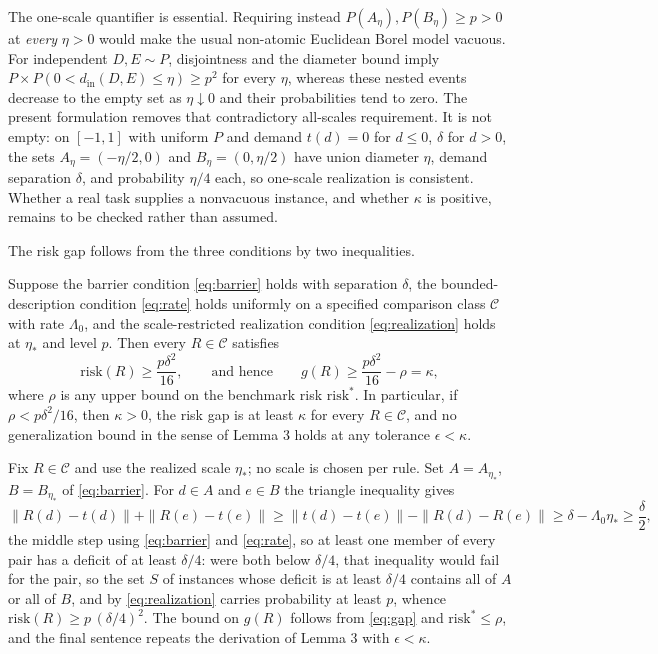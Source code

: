 The one-scale quantifier is essential. Requiring instead $P(A_\eta),P(B_\eta) \ge p>0$ at \emph{every} $\eta>0$ would make the usual non-atomic Euclidean Borel model vacuous. For independent $D,E \sim P$, disjointness and the diameter bound imply $P\times P(0<d_{\mathrm{in}}(D,E)\le\eta) \ge p^2$ for every $\eta$, whereas these nested events decrease to the empty set as $\eta \downarrow 0$ and their probabilities tend to zero. The present formulation removes that contradictory all-scales requirement. It is not empty: on $[-1,1]$ with uniform $P$ and demand $t(d)=0$ for $d\le0$, $\delta$ for $d>0$, the sets $A_\eta=(-\eta/2,0)$ and $B_\eta=(0,\eta/2)$ have union diameter $\eta$, demand separation $\delta$, and probability $\eta/4$ each, so one-scale realization is consistent. Whether a real task supplies a nonvacuous instance, and whether $\kappa$ is positive, remains to be checked rather than assumed.

The risk gap follows from the three conditions by two inequalities.

\begin{uprop}
Suppose the barrier condition \eqref{eq:barrier} holds with separation $\delta$, the bounded-description condition \eqref{eq:rate} holds uniformly on a specified comparison class $\mathcal{C}$ with rate $\Lambda_0$, and the scale-restricted realization condition \eqref{eq:realization} holds at $\eta_*$ and level $p$. Then every $R \in \mathcal{C}$ satisfies
\begin{equation}
\mathrm{risk}(R) \ge \frac{p \delta^2}{16} , \qquad \text{and hence} \qquad g(R) \ge \frac{p \delta^2}{16} - \rho = \kappa ,
\label{eq:floor}
\end{equation}
where $\rho$ is any upper bound on the benchmark risk $\mathrm{risk}^*$. In particular, if $\rho < p \delta^2 / 16$, then $\kappa > 0$, the risk gap is at least $\kappa$ for every $R \in \mathcal{C}$, and no generalization bound in the sense of Lemma 3 holds at any tolerance $\epsilon < \kappa$.
\end{uprop}

\argument Fix $R \in \mathcal{C}$ and use the realized scale $\eta_*$; no scale is chosen per rule. Set $A = A_{\eta_*}$, $B = B_{\eta_*}$ of \eqref{eq:barrier}. For $d \in A$ and $e \in B$ the triangle inequality gives
\begin{equation}
\| R(d) - t(d) \| + \| R(e) - t(e) \| \ge \| t(d) - t(e) \| - \| R(d) - R(e) \| \ge \delta - \Lambda_0 \eta_* \ge \frac{\delta}{2},
\label{eq:deficit}
\end{equation}
the middle step using \eqref{eq:barrier} and \eqref{eq:rate}, so at least one member of every pair has a deficit of at least $\delta / 4$: were both below $\delta / 4$, that inequality would fail for the pair, so the set $S$ of instances whose deficit is at least $\delta / 4$ contains all of $A$ or all of $B$, and by \eqref{eq:realization} carries probability at least $p$, whence $\mathrm{risk}(R) \ge p \, (\delta / 4)^2$. The bound on $g(R)$ follows from \eqref{eq:gap} and $\mathrm{risk}^* \le \rho$, and the final sentence repeats the derivation of Lemma 3 with $\epsilon < \kappa$.\qedbox

